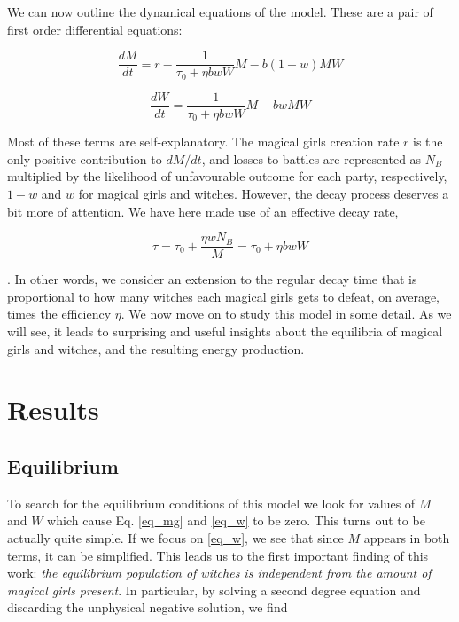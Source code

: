 \documentclass[]{article}
\begin{document}
We can now outline the dynamical equations of the model. These are a pair of first order differential equations:

\begin{equation}\label{eq_mg}
\frac{dM}{dt} = r-\frac{1}{\tau_0+\eta b w W}M-b (1-w)MW 
\end{equation}

\begin{equation}\label{eq_w}
\frac{dW}{dt} = \frac{1}{\tau_0+\eta b w W}M-bwMW 
\end{equation}

Most of these terms are self-explanatory. The magical girls creation rate $r$ is the only positive contribution to $dM/dt$, and losses to battles are represented as $N_B$ multiplied by the likelihood of unfavourable outcome for each party, respectively, $1-w$ and $w$ for magical girls and witches. However, the decay process deserves a bit more of attention. We have here made use of an effective decay rate,

\begin{equation}\label{tau}
\tau = \tau_0+\frac{\eta w N_B}{M} = \tau_0+\eta b w W
\end{equation}

. In other words, we consider an extension to the regular decay time that is proportional to how many witches each magical girls gets to defeat, on average, times the efficiency $\eta$.\newline
We now move on to study this model in some detail. As we will see, it leads to surprising and useful insights about the equilibria of magical girls and witches, and the resulting energy production.

\section{Results}
\subsection{Equilibrium}

To search for the equilibrium conditions of this model we look for values of $M$ and $W$ which cause Eq. \ref{eq_mg} and \ref{eq_w} to be zero. This turns out to be actually quite simple. If we focus on \ref{eq_w}, we see that since $M$ appears in both terms, it can be simplified. This leads us to the first important finding of this work: \textit{the equilibrium population of witches is independent from the amount of magical girls present}. In particular, by solving a second degree equation and discarding the unphysical negative solution, we find
\end{document}
